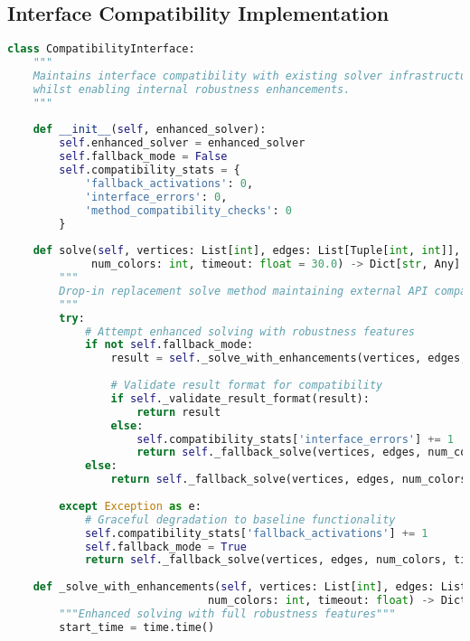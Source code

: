 
\subsection{Interface Compatibility Implementation}
\label{appendix:interface-compatibility}

\begin{lstlisting}[language=Python, caption=Interface Compatibility with Existing Solver Infrastructure]
class CompatibilityInterface:
    """
    Maintains interface compatibility with existing solver infrastructure
    whilst enabling internal robustness enhancements.
    """
    
    def __init__(self, enhanced_solver):
        self.enhanced_solver = enhanced_solver
        self.fallback_mode = False
        self.compatibility_stats = {
            'fallback_activations': 0,
            'interface_errors': 0,
            'method_compatibility_checks': 0
        }
    
    def solve(self, vertices: List[int], edges: List[Tuple[int, int]], 
             num_colors: int, timeout: float = 30.0) -> Dict[str, Any]:
        """
        Drop-in replacement solve method maintaining external API compatibility.
        """
        try:
            # Attempt enhanced solving with robustness features
            if not self.fallback_mode:
                result = self._solve_with_enhancements(vertices, edges, num_colors, timeout)
                
                # Validate result format for compatibility
                if self._validate_result_format(result):
                    return result
                else:
                    self.compatibility_stats['interface_errors'] += 1
                    return self._fallback_solve(vertices, edges, num_colors, timeout)
            else:
                return self._fallback_solve(vertices, edges, num_colors, timeout)
                
        except Exception as e:
            # Graceful degradation to baseline functionality
            self.compatibility_stats['fallback_activations'] += 1
            self.fallback_mode = True
            return self._fallback_solve(vertices, edges, num_colors, timeout)
    
    def _solve_with_enhancements(self, vertices: List[int], edges: List[Tuple[int, int]], 
                               num_colors: int, timeout: float) -> Dict[str, Any]:
        """Enhanced solving with full robustness features"""
        start_time = time.time()
        

\end{lstlisting}
